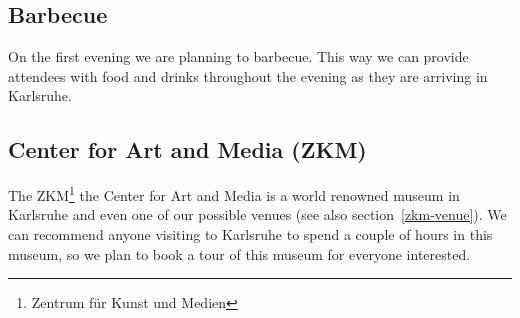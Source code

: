 \begin{multicols}{2}

\subsection{Barbecue}

On the first evening we are planning to barbecue. This way we can provide
attendees with food and drinks throughout the evening as they are arriving
in Karlsruhe.

\subsection{Center for Art and Media (ZKM)}

The ZKM\footnote{Zentrum für Kunst und Medien} the Center for Art and Media is
a world renowned museum in Karlsruhe and even one of our possible venues
(see also section~\ref{zkm-venue}). We can recommend anyone visiting to
Karlsruhe to spend a couple of hours in this museum, so we plan to book a tour
of this museum for everyone interested.



\end{multicols}

\newpage
